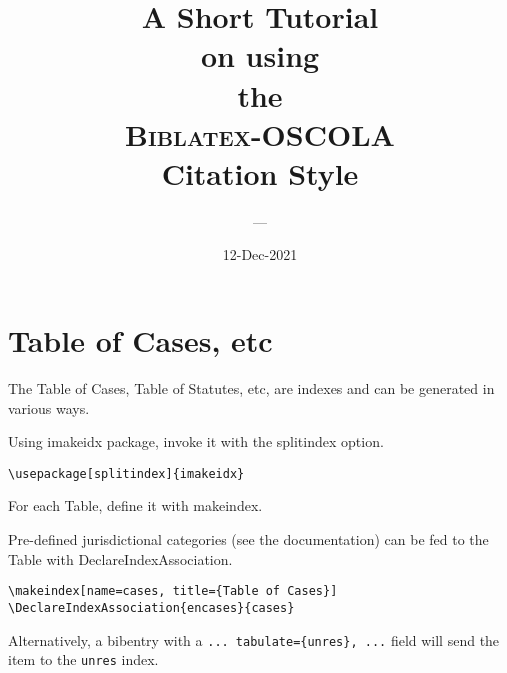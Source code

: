 
\title{A Short Tutorial{\normalsize \\ on using\\ the}\\   \textsc{Biblatex-OSCOLA}\\ Citation Style}
\author{---}
\date{12-Dec-2021}



\maketitle



\begin{center}
\end{center}


\newpage
\citetrackerfalse
\printindexearly[cases]
\printindexearly[unres]
\citetrackertrue
\newpage

\bigskip
\section{Table of Cases, etc}
The Table of Cases, Table of Statutes, etc, are indexes and can be generated in various ways.

Using imakeidx package, invoke it with the splitindex option.

\begin{verbatim}
\usepackage[splitindex]{imakeidx}
\end{verbatim}

For each Table, define it with makeindex.

Pre-defined jurisdictional categories (see the documentation) can be fed to the Table with DeclareIndexAssociation.

\begin{verbatim}
\makeindex[name=cases, title={Table of Cases}]
\DeclareIndexAssociation{encases}{cases}
\end{verbatim}

Alternatively, a bibentry with a \verb|... tabulate={unres}, ...| field will send the item to the \verb|unres| index.

